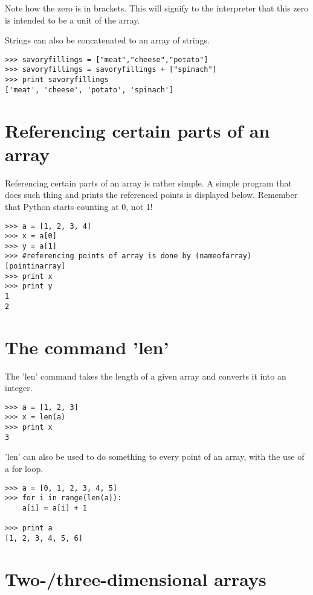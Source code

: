 Note how the zero is in brackets. This will signify to the interpreter that this zero is intended to be a unit of the array.

Strings can also be concatenated to an array of strings.

\begin{verbatim}
>>> savoryfillings = ["meat","cheese","potato"] 
>>> savoryfillings = savoryfillings + ["spinach"] 
>>> print savoryfillings 
['meat', 'cheese', 'potato', 'spinach']
\end{verbatim}



\section{Referencing certain parts of an array}

Referencing certain parts of an array is rather simple. A simple program that does such thing and prints the referenced points is displayed below. Remember that Python starts counting at 0, not 1!

\begin{verbatim}
>>> a = [1, 2, 3, 4]
>>> x = a[0]
>>> y = a[1]
>>> #referencing points of array is done by (nameofarray)[pointinarray]
>>> print x
>>> print y
1
2
\end{verbatim}




\section{The command 'len'}

The 'len' command takes the length of a given array and converts it
into an integer. 

\begin{verbatim}
>>> a = [1, 2, 3]
>>> x = len(a)
>>> print x
3
\end{verbatim}



'len' can also be used to do something to every point of an array,
with the use of a for loop.

\begin{verbatim}
>>> a = [0, 1, 2, 3, 4, 5]
>>> for i in range(len(a)): 	
	a[i] = a[i] + 1

>>> print a 
[1, 2, 3, 4, 5, 6]  
\end{verbatim}



\section{Two-/three-dimensional arrays}

